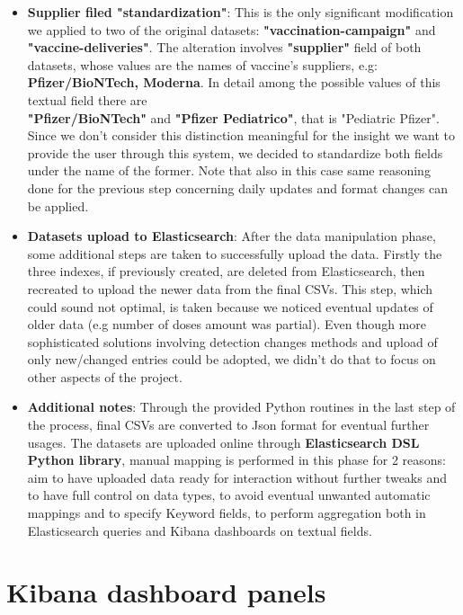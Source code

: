 \documentclass{article}[IEEEtran]
\begin{document}
\begin{itemize}
    \item \textbf{Supplier filed "standardization"}: This is the only significant modification we applied to two of the original datasets: \textbf{"vaccination-campaign"} and \textbf{"vaccine-deliveries"}. The alteration involves \textbf{"supplier"} field of both datasets, whose values are the names of vaccine's suppliers, e.g: \\ \textbf{Pfizer/BioNTech, Moderna}. In detail among the possible values of this textual field there are \\ \textbf{"Pfizer/BioNTech"} and \textbf{"Pfizer Pediatrico"}, that is "Pediatric Pfizer". Since we don't consider this distinction meaningful for the insight we want to provide the user through this system, we decided to standardize both fields under the name of the former. Note that also in this case same reasoning done for the previous step concerning daily updates and format changes can be applied.
    
    \item \textbf{Datasets upload to Elasticsearch}: After the data manipulation phase, some additional steps are taken to successfully upload the data. Firstly the three indexes, if previously created, are deleted from Elasticsearch, then recreated to upload the newer data from the final CSVs. This step, which could sound not optimal, is taken because we noticed eventual updates of older data (e.g number of doses amount was partial). Even though more sophisticated solutions involving detection changes methods and upload of only new/changed entries could be adopted, we didn't do that to focus on other aspects of the project.
    
    \item \textbf{Additional notes}: Through the provided Python routines in the last step of the process, final CSVs are converted to Json format for eventual further usages. The datasets are uploaded online through \textbf{Elasticsearch DSL Python library}, manual mapping is performed in this phase for 2 reasons: aim to have uploaded data ready for interaction without further tweaks and to have full control on data types, to avoid eventual unwanted automatic mappings and to specify Keyword fields, to perform aggregation both in Elasticsearch queries and Kibana dashboards on textual fields.
    
\end{itemize}

\newpage

\section{Kibana dashboard panels}\label{sec:dashboard}
\end{document}
